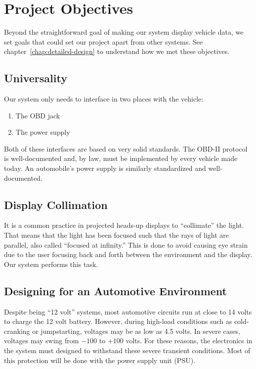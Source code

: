 \chapter{Project Objectives}



Beyond the straightforward goal of making our system display vehicle data, we
set goals that could set our project apart from other systems. See
chapter~\ref{chap:detailed-design} to understand how we met these objectives.

\section{Universality}

Our system only needs to interface in two places with the vehicle:

\begin{enumerate}

\item The OBD jack
\item The power supply

\end{enumerate}

Both of these interfaces are based on very solid standards. The OBD-II protocol
is well-documented and, by law, must be implemented by every vehicle made
today. An automobile's power supply is similarly standardized and
well-documented.

\section{Display Collimation}

It is a common practice in projected heads-up displays to ``collimate'' the
light. That means that the light has been focused such that the rays of light
are parallel, also called ``focused at infinity.'' This is done to avoid
causing eye strain due to the user focusing back and forth between the
environment and the display. Our system performs this task.

\section{Designing for an Automotive Environment}

Despite being ``12 volt'' systems, most automotive circuits run at close to 
14 volts to charge the 12 volt battery. However, during high-load conditions 
such as cold-cranking or jumpstarting, voltages may be as low as 4.5 volts.  
In severe cases, voltages may swing from $-100$ to $+100$ volts. For these 
reasons, the electronics in the system must designed to withstand these severe
transient conditions. Most of this protection will be done with the power supply
unit (PSU).
